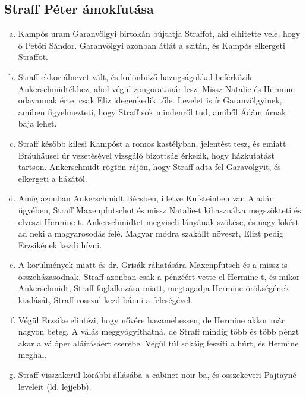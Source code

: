 \documentclass{thesis-ekf}
\begin{document}
    \subsection{Straff Péter ámokfutása}

    \begin{enumerate}[a)]
        \item\label{itm:Petofi} Kampós uram Garanvölgyi birtokán bújtatja Straffot, aki elhitette vele, hogy ő Petőfi Sándor.
        Garanvölgyi azonban átlát a szitán, és Kampós elkergeti Straffot.
        \item\label{itm:Bogumil} Straff ekkor álnevet vált, és különböző hazugságokkal beférkőzik Ankerschmidtékhez, ahol végül zongoratanár lesz.
        Missz Natalie és Hermine odavannak érte, csak Eliz idegenkedik tőle.
        Levelet is ír Garanvölgyinek, amiben figyelmezteti, hogy Straff sok mindenről tud, amiből Ádám úrnak baja lehet.
        \item\label{itm:hazkutatas} Straff később kilesi Kampóst a romos kastélyban, jelentést tesz, és emiatt Bräuhäusel úr vezetésével
            vizsgáló bizottság érkezik, hogy házkutatást tartson.
        Ankerschmidt rögtön rájön, hogy Straff adta fel Garavölgyit, és elkergeti a házától.
        \item\label{itm:Hermine-szokese} Amíg azonban Ankerschmidt Bécsben, illetve Kufsteinben van Aladár ügyében,
            Straff Maxenpfutschot és missz Natalie-t kihasználva megszökteti és elveszi Hermine-t.
        Ankerschmidtet megviseli lányának szökése, és nagy lökést ad neki a magyarosodás felé.
        Magyar módra szakállt növeszt, Elizt pedig Erzsikének kezdi hívni.
        \item\label{itm:nincs-hozomany} A körülmények miatt és dr. Grisák ráhatására Maxenpfutsch és a missz is összeházasodnak.
        Straff azonban csak a pénzéért vette el Hermine-t, és mikor Ankerschmidt, Straff foglalkozása miatt,
            megtagadja Hermine örökségének kiadását, Straff rosszul kezd bánni a feleségével.
        \item\label{itm:Archimedeszi-csavar} Végül Erzsike elintézi, hogy nővére hazamehessen, de Hermine akkor már nagyon beteg.
        A válás meggyógyíthatná, de Straff mindig több és több pénzt akar a válóper aláírásáért cserébe.
        Végül túl sokáig feszíti a húrt, és Hermine meghal.
        \item\label{itm:cabinet-noir} Straff visszakerül korábbi állásába a cabinet noir-ba, és összekeveri Pajtayné leveleit (ld. lejjebb).
    \end{enumerate}
\end{document}
